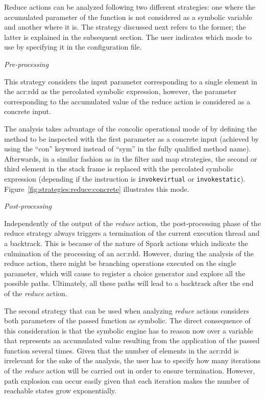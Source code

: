 Reduce actions can be analyzed following two different strategies: one where the accumulated parameter of the function is not considered as a symbolic variable and another where it is. The strategy discussed next refers to the former; the latter is explained in the subsequent section. The user indicates which mode to use by specifying it in the configuration file.

\textit{Pre-processing}

This strategy considers the input parameter corresponding to a single element in the \acrshort{acr:rdd} as the percolated symbolic expression, however, the parameter corresponding to the accumulated value of the reduce action is considered as a concrete input. 

The analysis takes advantage of the concolic operational mode of \spf{} by defining the method to be inspected with the first parameter as a concrete input (achieved by using the ``con'' keyword instead of ``sym'' in the fully qualified method name). Afterwards, in a similar fashion as in the filter and map strategies, the second or third element in the stack frame is replaced with the percolated symbolic expression (depending if the instruction is \texttt{invokevirtual} or \texttt{invokestatic}). Figure~\ref{fig:strategies:reduce:concrete} illustrates this mode.

\textit{Post-processing}

Independently of the output of the \textit{reduce} action, the post-processing phase of the reduce strategy always triggers a termination of the current execution thread and a backtrack. This is because of the nature of Spark actions which indicate the culmination of the processing of an \acrshort{acr:rdd}. However, during the analysis of the reduce action, there might be branching operations executed on the single parameter, which will cause \spf{} to register a choice generator and explore all the possible paths. Ultimately, all these paths will lead to a backtrack after the end of the \textit{reduce} action.


The second strategy that can be used when analyzing \textit{reduce} actions considers both parameters of the passed function as symbolic. The direct consequence of this consideration is that the symbolic engine has to reason now over a variable that represents an accumulated value resulting from the application of the passed function several times. Given that the number of elements in the \acrshort{acr:rdd} is irrelevant for the sake of the analysis, the user has to specify how many iterations of the \textit{reduce} action will be carried out in order to ensure termination. However, path explosion can occur easily given that each iteration makes the number of reachable states grow exponentially.

